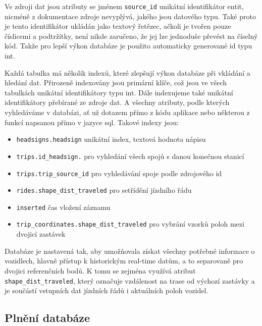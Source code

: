 Ve zdroji dat jsou atributy se jménem \verb-source_id- unikátní identifikátor entit, nicméně z dokumentace zdroje nevyplývá, jakého jsou datového typu. Také proto je tento identifikátor ukládán jako textový řetězec, ačkoli je tvořen pouze číslicemi a podtržítky, není nikde zaručeno, že jej lze jednoduše převést na číselný kód. Takže pro lepší výkon databáze je použito automaticky generované id typu \gls{int}.


\bigbreak


Každá tabulka má několik indexů, které zlepšují výkon databáze při vkládání a hledání dat. Přirozeně indexovány jsou primární klíče, což jsou ve všech tabulkách unikátní identifikátory typu \gls{int}. Dále indexujeme také unikátní identifikátory přebírané ze zdroje dat. A všechny atributy, podle kterých vyhledáváme v databázi, ať už dotazem přímo z kódu aplikace nebo některou z funkcí napsanou přímo v jazyce \gls{sql}. Takové indexy jsou:


\begin{itemize}


\item \verb-headsigns.headsign- unikátní index, textová hodnota nápisu


\item \verb-trips.id_headsign.- pro vyhledání všech spojů s danou konečnou stanicí


\item \verb-trips.trip_source_id- pro vyhledávání spoje podle zdrojového id


\item \verb-rides.shape_dist_traveled- pro setřídění jízdního řádu
\item \verb-inserted- čas vložení záznamu


\item \verb-trip_coordinates.shape_dist_traveled- pro vybrání vzorků poloh mezi dvojicí zastávek


\end{itemize}


\bigbreak


Databáze je nastavená tak, aby umožňovala získat všechny potřebné informace o vozidlech, hlavně přístup k historickým real-time datům, a to separovaně pro dvojici referenčních bodů. K tomu se zejména využívá atribut \verb-shape_dist_traveled-, který označuje vzdálenost na trase od výchozí zastávky a je součástí vstupních dat jízdních řádů i aktuálních poloh vozidel.


\subsection{Plnění databáze}


